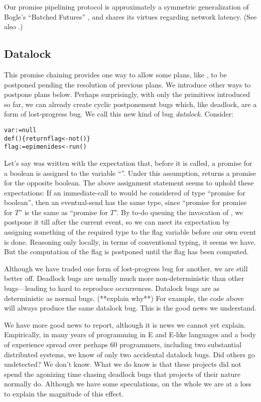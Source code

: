 \documentclass{llncs}
\begin{document}
Our promise pipelining protocol is approximately a symmetric
generalization of Bogle's ``Batched Futures'' \cite{bogle:batched},
and shares its virtues regarding network latency. (See also
\cite{liskov:promises}.)

\subsection{Datalock}

This promise chaining provides one way to allow some plans, like
, to be postponed pending the resolution of previous
plans. We introduce other ways to postpone plans below. Perhaps
surprisingly, with only the primitives introduced so far, we can
already create cyclic postponement bugs which, like deadlock, are a
form of lost-progress bug. We call this new kind of bug
\emph{datalock}. Consider:
%
\begin{alltt}
    var  := null
    def () \{ return flag <- not() \}
    flag := epimenides <- run()
\end{alltt}
%
Let's say  was written with the expectation that,
before it is called, a promise for a boolean is assigned to the
variable ``''. Under this assumption, 
returns a promise for the opposite boolean. The above assignment
statement seems to uphold these expectations: If an immediate-call to
 would be considered of type ``promise for boolean'',
then an eventual-send has the same type, since ``promise for promise
for $T$'' is the same as ``promise for $T$''. By to-do queuing the
invocation of , we postpone it till after the current
event, so we can meet its expectation by assigning something of the
required type to the flag variable before our own event is
done. Reasoning only locally, in terms of conventional typing, it
seems we have. But the computation of the flag is postponed until the
flag has been computed.

Although we have traded one form of lost-progress bug for another, we
are still better off. Deadlock bugs are usually much more
non-deterministic than other bugs---leading to hard to reproduce
occurrences. Datalock bugs are as deterministic as normal
bugs. (**explain why**) For example, the code above will always
produce the same datalock bug. This is the good news we understand.

We have more good news to report, although it is news we cannot yet
explain. Empirically, in many years of programming in E and E-like
languages and a body of experience spread over perhaps 60 programmers,
including two substantial distributed systems, we know of only two
accidental datalock bugs. Did others go undetected? We don't
know. What we do know is that these projects did not spend the
agonizing time chasing deadlock bugs that projects of their nature
normally do. Although we have some speculations, on the whole we are
at a loss to explain the magnitude of this effect.
\end{document}
